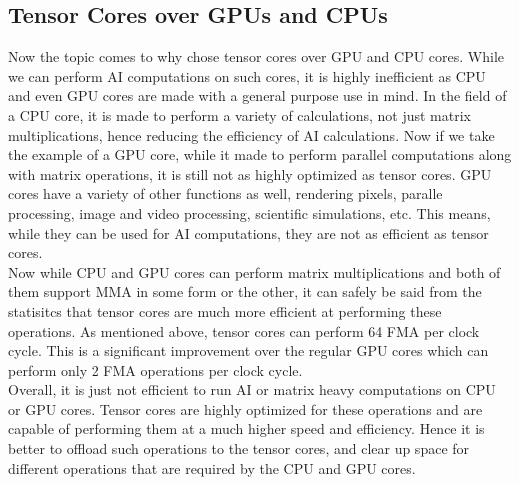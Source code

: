 \documentclass[12pt]{article}
\begin{document}
\subsection{Tensor Cores over GPUs and CPUs}
Now the topic comes to why chose tensor cores over GPU and CPU cores. While we can perform AI computations on such cores, it is highly inefficient as CPU and even GPU cores are made with a general purpose use in mind. In the field of a CPU core, it is made to perform a variety of calculations, not just matrix multiplications, hence reducing the efficiency of AI calculations.
Now if we take the example of a GPU core, while it made to perform parallel computations along with matrix operations, it is still not as highly optimized as tensor cores. GPU cores have a variety of other functions as well, rendering pixels, paralle processing, image and video processing, scientific simulations, etc. This means, while they can be used for AI computations, they are not as efficient as tensor cores.\\
Now while CPU and GPU cores can perform matrix multiplications and both of them support MMA in some form or the other, it can safely be said from the statisitcs that tensor cores are much more efficient at performing these operations.
As mentioned above, tensor cores can perform 64 FMA per clock cycle. This is a significant improvement over the regular GPU cores which can perform only 2 FMA operations per clock cycle.\\
Overall, it is just not efficient to run AI or matrix heavy computations on CPU or GPU cores. Tensor cores are highly optimized for these operations and are capable of performing them at a much higher speed and efficiency. Hence it is better to offload such operations to the tensor cores, and clear up space for different operations that are required by the CPU and GPU cores.

\end{document}
